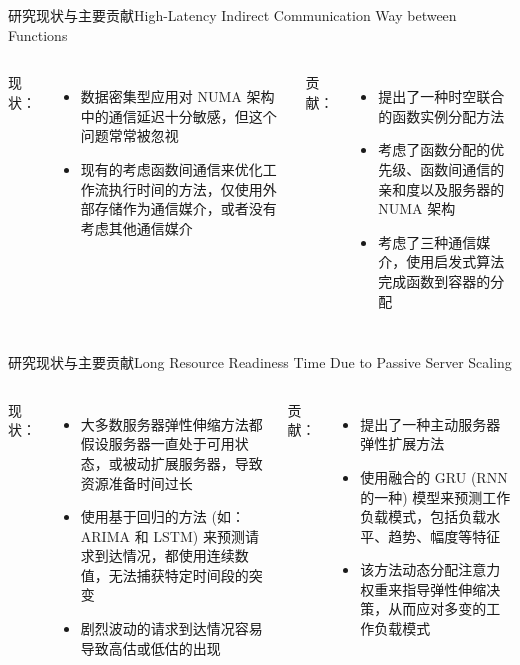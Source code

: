 \documentclass[aspectratio=169]{beamer}
\begin{document}
\begin{frame}{研究现状与主要贡献}{High-Latency Indirect Communication Way between Functions}
  \begin{columns}
    现状：
    \begin{itemize}
      \item 数据密集型应用对 NUMA 架构中的通信延迟十分敏感，但这个问题常常被忽视
      \item 现有的考虑函数间通信来优化工作流执行时间的方法，仅使用外部存储作为通信媒介，或者没有考虑其他通信媒介
    \end{itemize}

    贡献：
    \begin{itemize}
      \item 提出了一种时空联合的函数实例分配方法
      \item 考虑了函数分配的优先级、函数间通信的亲和度以及服务器的 NUMA 架构
      \item 考虑了三种通信媒介，使用启发式算法完成函数到容器的分配
    \end{itemize}
  \end{columns}
\end{frame}

\begin{frame}{研究现状与主要贡献}{Long Resource Readiness Time Due to Passive Server Scaling}
  \begin{columns}
    现状：
    \begin{itemize}
      \item 大多数服务器弹性伸缩方法都假设服务器一直处于可用状态，或被动扩展服务器，导致资源准备时间过长
      \item 使用基于回归的方法 (如：ARIMA 和 LSTM) 来预测请求到达情况，都使用连续数值，无法捕获特定时间段的突变
      \item 剧烈波动的请求到达情况容易导致高估或低估的出现
    \end{itemize}

    贡献：
    \begin{itemize}
      \item 提出了一种主动服务器弹性扩展方法
      \item 使用融合的 GRU (RNN的一种) 模型来预测工作负载模式，包括负载水平、趋势、幅度等特征
      \item 该方法动态分配注意力权重来指导弹性伸缩决策，从而应对多变的工作负载模式
    \end{itemize}
  \end{columns}
\end{frame}
\end{document}
